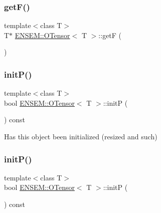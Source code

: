 \mbox{\label{classENSEM_1_1OTensor_acaf63577c9d67fe58f649ae9fac008c1}} 
\subsubsection{\texorpdfstring{getF()}{getF()}\hspace{0.1cm}{\footnotesize\ttfamily [6/6]}}
{\footnotesize\ttfamily template$<$class T$>$ \\
T$\ast$ \mbox{\hyperlink{classENSEM_1_1OTensor}{E\+N\+S\+E\+M\+::\+O\+Tensor}}$<$ T $>$\+::getF (\begin{DoxyParamCaption}{ }\end{DoxyParamCaption})\hspace{0.3cm}{\ttfamily [inline]}}

\mbox{\label{classENSEM_1_1OTensor_a3f591732bdd0b358cde1069b21fbf1f5}} 
\subsubsection{\texorpdfstring{initP()}{initP()}\hspace{0.1cm}{\footnotesize\ttfamily [1/3]}}
{\footnotesize\ttfamily template$<$class T$>$ \\
bool \mbox{\hyperlink{classENSEM_1_1OTensor}{E\+N\+S\+E\+M\+::\+O\+Tensor}}$<$ T $>$\+::initP (\begin{DoxyParamCaption}{ }\end{DoxyParamCaption}) const\hspace{0.3cm}{\ttfamily [inline]}}



Has this object been initialized (resized and such) 

\mbox{\label{classENSEM_1_1OTensor_a3f591732bdd0b358cde1069b21fbf1f5}} 
\subsubsection{\texorpdfstring{initP()}{initP()}\hspace{0.1cm}{\footnotesize\ttfamily [2/3]}}
{\footnotesize\ttfamily template$<$class T$>$ \\
bool \mbox{\hyperlink{classENSEM_1_1OTensor}{E\+N\+S\+E\+M\+::\+O\+Tensor}}$<$ T $>$\+::initP (\begin{DoxyParamCaption}{ }\end{DoxyParamCaption}) const\hspace{0.3cm}{\ttfamily [inline]}}



